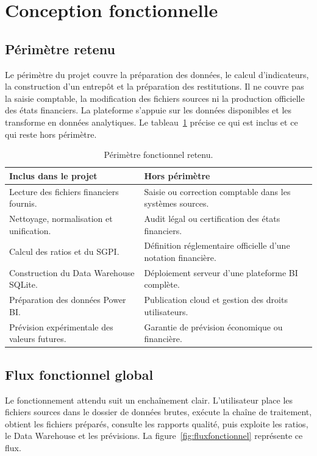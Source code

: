 \section{Conception fonctionnelle}
\label{sec:conception_fonctionnelle}
\subsection{Périmètre retenu}
\par Le périmètre du projet couvre la préparation des données, le calcul
d'indicateurs, la construction d'un entrepôt et la préparation des restitutions.
Il ne couvre pas la saisie comptable, la modification des fichiers sources ni la
production officielle des états financiers. La plateforme s'appuie sur les
données disponibles et les transforme en données analytiques. Le
tableau~\ref{tab:perimetre} précise ce qui est inclus et ce qui reste hors
périmètre.

\begin{table}[H]
\centering
\caption[Périmètre de la solution]{Périmètre fonctionnel retenu.}
\label{tab:perimetre}
\begin{tabularx}{\linewidth}{|X|X|}
\hline
\textbf{Inclus dans le projet} & \textbf{Hors périmètre} \\ \hline
Lecture des fichiers financiers fournis. & Saisie ou correction comptable dans les systèmes sources. \\ \hline
Nettoyage, normalisation et unification. & Audit légal ou certification des états financiers. \\ \hline
Calcul des ratios et du SGPI. & Définition réglementaire officielle d'une notation financière. \\ \hline
Construction du Data Warehouse SQLite. & Déploiement serveur d'une plateforme BI complète. \\ \hline
Préparation des données Power BI. & Publication cloud et gestion des droits utilisateurs. \\ \hline
Prévision expérimentale des valeurs futures. & Garantie de prévision économique ou financière. \\ \hline
\end{tabularx}
\end{table}

\subsection{Flux fonctionnel global}
\par Le fonctionnement attendu suit un enchaînement clair. L'utilisateur place
les fichiers sources dans le dossier de données brutes, exécute la chaîne de
traitement, obtient les fichiers préparés, consulte les rapports qualité, puis
exploite les ratios, le Data Warehouse et les prévisions. La
figure~\ref{fig:fluxfonctionnel} représente ce flux.

